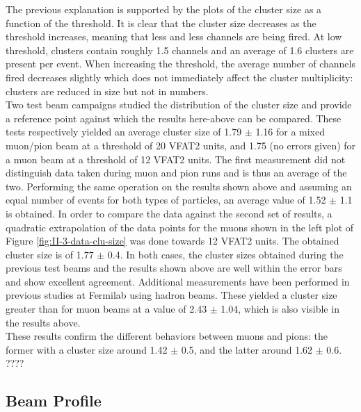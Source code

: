       The previous explanation is supported by the plots of the cluster size as a function of the threshold. It is clear that the cluster size decreases as the threshold increases, meaning that less and less channels are being fired. At low threshold, clusters contain roughly 1.5 channels and an average of 1.6 clusters are present per event. When increasing the threshold, the average number of channels fired decreases slightly which does not immediately affect the cluster multiplicity: clusters are reduced in size but not in numbers. \\

      Two test beam campaigns \cite{Abbaneo:1401079, Abbaneo:1494965} studied the distribution of the cluster size and provide a reference point against which the results here-above can be compared. These tests respectively yielded an average cluster size of 1.79 $\pm$ 1.16 for a mixed muon/pion beam at a threshold of 20 VFAT2 units, and 1.75 (no errors given) for a muon beam at a threshold of 12 VFAT2 units. The first measurement did not distinguish data taken during muon and pion runs and is thus an average of the two. Performing the same operation on the results shown above and assuming an equal number of events for both types of particles, an average value of 1.52 $\pm$ 1.1 is obtained. In order to compare the data against the second set of results, a quadratic extrapolation of the data points for the muons shown in the left plot of Figure \ref{fig:II-3-data-clu-size} was done towards 12 VFAT2 units. The obtained cluster size is of 1.77 $\pm$ 0.4. In both cases, the cluster sizes obtained during the previous test beams and the results shown above are well within the error bars and show excellent agreement. Additional measurements have been performed in previous studies \cite{Abbaneo:1973272} at Fermilab using hadron beams. These yielded a cluster size greater than for muon beams at a value of 2.43 $\pm$ 1.04, which is also visible in the results above. \\

      These results confirm the different behaviors between muons and pions: the former with a cluster size around 1.42 $\pm$ 0.5, and the latter around 1.62 $\pm$ 0.6.  ????


    \subsection{Beam Profile}


